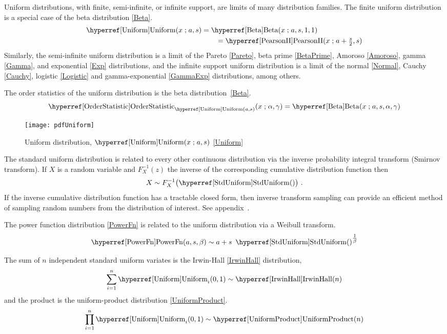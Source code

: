 Uniform distributions, with finite, semi-infinite, or infinite support, are limits of many distribution families. The finite uniform distribution is a special case of the beta distribution \eqref{Beta}.
\begin{align*}
 \opr{Uniform}(x\given a,s)  &=  \opr{Beta}(x\given a, s, 1,1) 	\checked
 \\
 &\qquad=  \opr{PearsonII}(x\given a+\tfrac{s}{2}, s) \checked
\end{align*}
Similarly, the semi-infinite uniform distribution is a limit of the Pareto \eqref{Pareto}, beta prime \eqref{BetaPrime}, Amoroso \eqref{Amoroso}, gamma \eqref{Gamma}, and exponential  \eqref{Exp} distributions, and the infinite support uniform distribution is a limit of the normal \eqref{Normal}, Cauchy \eqref{Cauchy}, logistic \eqref{Logistic} and  gamma-exponential  \eqref{GammaExp} distributions, among others. 

The order statistics  of the uniform distribution is the beta distribution~\eqref{Beta}.
\[
\opr{OrderStatistic}_{\opr{Uniform}(a,s)}(x \given \alpha, \gamma) =  \opr{Beta}(x\given a, s, \alpha, \gamma) 
\checked
\notag
\]


\begin{figure}[t]
\begin{center}
\texttt{[image: pdfUniform]}
\end{center}
\caption[Uniform distribution]{Uniform distribution, $\opr{Uniform}(x\given a,s)$ \eqref{Uniform}}
\end{figure}


The standard uniform distribution is related to every other continuous distribution via the  inverse probability integral transform (Smirnov transform). If $X$ is a random variable and $F_X^{-1}(z)$ the inverse of the corresponding cumulative distribution function then 
\[ 
X \sim F_X^{-1}\bigl( \opr{StdUniform}() \bigr) \ .  \checked
\notag
\]
If the inverse cumulative distribution function has a tractable closed form, then inverse transform sampling can provide an efficient method of sampling random numbers from the distribution of interest. See appendix~.

The power function distribution \eqref{PowerFn} is related to the uniform distribution via a Weibull transform.
\[
\opr{PowerFn}(a,s,\beta) \sim a + s\ \opr{StdUniform}()^{\tfrac{1}{\beta}}  \checked
\notag
\]

The sum of $n$ independent standard uniform variates is the  Irwin-Hall \eqref{IrwinHall} distribution,
\[
\sum_{i=1}^{n} \opr{Uniform}_i(0,1)  \sim \opr{IrwinHall}(n) \checked
\notag
\]
and the product is the uniform-product distribution \eqref{UniformProduct}.
\[
\prod_{i=1}^{n} \opr{Uniform}_i(0,1)  \sim \opr{UniformProduct}(n) \checked
\notag
\]




